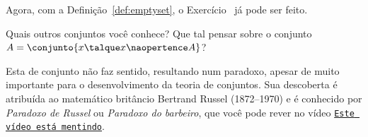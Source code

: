 Agora, com a Definição~\ref{def:emptyset}, o Exercício~ já pode ser feito.

\begin{example}
    Quais outros conjuntos você conhece? Que tal pensar sobre o conjunto $A = \conjunto{ x \talque x \naopertence A}$?
\end{example}

Esta  de conjunto não faz sentido, resultando num paradoxo, apesar de muito importante para o desenvolvimento da teoria de conjuntos. Sua descoberta é atribuída ao matemático britâncio Bertrand Russel (1872--1970) e é conhecido por \emph{Paradoxo de Russel} ou \emph{Paradoxo do barbeiro}, que você pode rever no vídeo \href{https://youtu.be/UI1xR_AECrU}{\texttt{Este vídeo está mentindo}}.